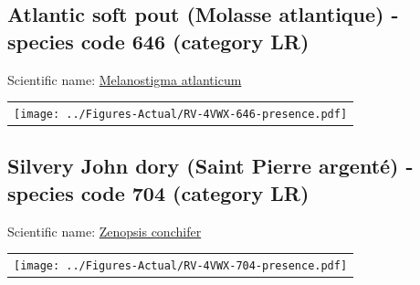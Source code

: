 \documentclass[12pt]{article}\usepackage[]{graphicx}\usepackage[]{color}
\begin{document}
\hypertarget{sec:646}{%
\subsection{Atlantic soft pout (Molasse atlantique) - species code 646 (category LR)}\label{sec:646}}

  


Scientific name: \href{http://www.marinespecies.org/aphia.php?p=taxdetails\&id=127120}{Melanostigma atlanticum} \newline
\begin{minipage}{1.0\textwidth}
 \begin{tabular}{c}
\texttt{[image: ../Figures-Actual/RV-4VWX-646-presence.pdf]} \\ 
\end{tabular} 
\end{minipage}
\clearpage

\renewcommand\thefigure{\thesubsection\Alph{figure}}

\setcounter{figure}{0}

\hypertarget{sec:704}{%
\subsection{Silvery John dory (Saint Pierre argenté) - species code 704 (category LR)}\label{sec:704}}

  


Scientific name: \href{http://www.marinespecies.org/aphia.php?p=taxdetails\&id=127426}{Zenopsis conchifer} \newline
\begin{minipage}{1.0\textwidth}
 \begin{tabular}{c}
\texttt{[image: ../Figures-Actual/RV-4VWX-704-presence.pdf]} \\ 
\end{tabular} 
\end{minipage}
\clearpage

\renewcommand\thefigure{\thesubsection\Alph{figure}}

\setcounter{figure}{0}
\end{document}
